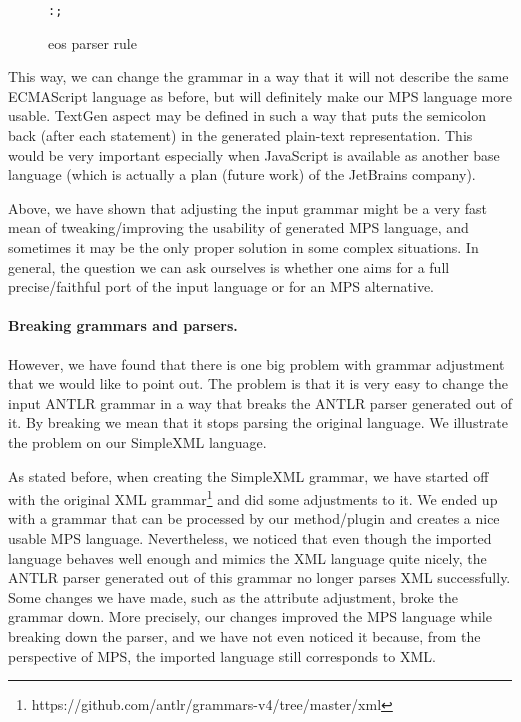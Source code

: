 \begin{figure}[ht]
\centering
\begin{framed}
\begin{alltt}
	 : \antlrliteral{;} ;
\end{alltt}
\end{framed}
\caption{eos parser rule}
\label{fig:eosrule}
\end{figure}

This way, we can change the grammar in a way that it will not describe the same ECMAScript language as before, but will definitely make our MPS language more usable.
TextGen aspect may be defined in such a way that puts the semicolon back (after each statement) in the generated plain-text representation.
This would be very important especially when JavaScript is available as another base language (which is actually a plan (future work) of the JetBrains company).

Above, we have shown that adjusting the input grammar might be a very fast mean of tweaking/improving the usability of generated MPS language, and sometimes it may be the only proper solution in some complex situations.
In general, the question we can ask ourselves is whether one aims for a full precise/faithful port of the input language or for an MPS alternative.


\paragraph{Breaking grammars and parsers.}
However, we have found that there is one big problem with grammar adjustment that we would like to point out.
The problem is that it is very easy to change the input ANTLR grammar in a way that breaks the ANTLR parser generated out of it.
By breaking we mean that it stops parsing the original language.
We illustrate the problem on our SimpleXML language.

As stated before, when creating the SimpleXML grammar, we have started off with the original XML grammar\footnote{https://github.com/antlr/grammars-v4/tree/master/xml} and did some adjustments to it.
We ended up with a grammar that can be processed by our method/plugin and creates a nice usable MPS language.
Nevertheless, we noticed that even though the imported language behaves well enough and mimics the XML language quite nicely, the ANTLR parser generated out of this grammar no longer parses XML successfully.
Some changes we have made, such as the attribute adjustment, broke the grammar down.
More precisely, our changes improved the MPS language while breaking down the parser, and we have not even noticed it because, from the perspective of MPS, the imported language still corresponds to XML.

